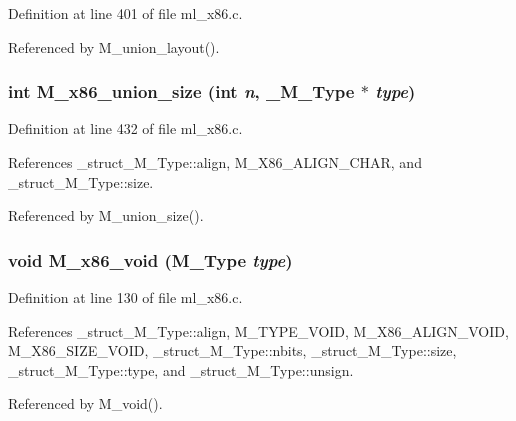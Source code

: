 Definition at line 401 of file ml\_\-x86.c.

Referenced by M\_\-union\_\-layout().
\subsubsection{\setlength{\rightskip}{0pt plus 5cm}int M\_\-x86\_\-union\_\-size (int {\em n}, \bf{\_\-M\_\-Type} $\ast$ {\em type})}\label{m__x86_8h_ec220f34827e3091c1624e2c5ac59c31}




Definition at line 432 of file ml\_\-x86.c.

References \_\-struct\_\-M\_\-Type::align, M\_\-X86\_\-ALIGN\_\-CHAR, and \_\-struct\_\-M\_\-Type::size.

Referenced by M\_\-union\_\-size().
\subsubsection{\setlength{\rightskip}{0pt plus 5cm}void M\_\-x86\_\-void (\bf{M\_\-Type} {\em type})}\label{m__x86_8h_7bdd9e958d231e4f5c4d5be87f5b2364}




Definition at line 130 of file ml\_\-x86.c.

References \_\-struct\_\-M\_\-Type::align, M\_\-TYPE\_\-VOID, M\_\-X86\_\-ALIGN\_\-VOID, M\_\-X86\_\-SIZE\_\-VOID, \_\-struct\_\-M\_\-Type::nbits, \_\-struct\_\-M\_\-Type::size, \_\-struct\_\-M\_\-Type::type, and \_\-struct\_\-M\_\-Type::unsign.

Referenced by M\_\-void().